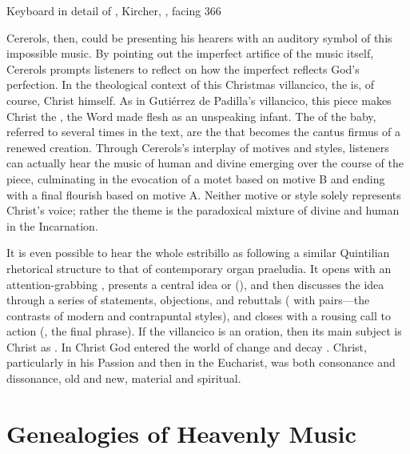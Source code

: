 {Keyboard in detail of , Kircher, , facing 366}

Cererols, then, could be presenting his hearers with an auditory symbol of this
impossible music.
By pointing out the imperfect artifice of the music itself, Cererols prompts
listeners to reflect on how the imperfect reflects God's perfection.
In the theological context of this Christmas villancico, the  is, of course, Christ himself.
As in Gutiérrez de Padilla's villancico, this piece makes Christ the
, the Word made flesh as an unspeaking infant.
The  of the baby, referred to several times in the text, are the
 that becomes the cantus firmus of a renewed creation.
Through Cererols's interplay of motives and styles, listeners can actually hear
the music of human and divine emerging over the course of the piece,
culminating in the evocation of a motet based on motive B and ending with a
final flourish based on motive A.
Neither motive or style solely represents Christ's voice; rather the theme is
the paradoxical mixture of divine and human in the Incarnation.


It is even possible to hear the whole estribillo as following a similar
Quintilian rhetorical structure to that of contemporary organ praeludia.%
    \Autocite{Jacobson:BuxtehudeRhetoric}
It opens with an attention-grabbing , presents a central idea or
 (), and then discusses the
idea through a series of statements, objections, and rebuttals (
with  pairs---the contrasts of modern and
contrapuntal styles), and closes with a rousing call to action
(, the final phrase).
If the villancico is an oration, then its main subject is Christ as .
In Christ God entered the world of change and decay .
Christ, particularly in his Passion and then in the Eucharist, was both
consonance and dissonance, old and new, material and spiritual.


\section{Genealogies of Heavenly Music}

